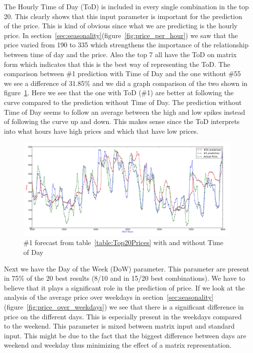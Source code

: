 The Hourly Time of Day (ToD) is included in every single combination in the top 20. This clearly shows that this input parameter is important for the prediction of the price. This is kind of obvious since what we are predicting is the hourly price. In section~\ref{sec:seasonality}(figure~\ref{fig:price_per_hour}) we saw that the price varied from 190 to 335 which strengthens the importance of the relationship between time of day and the price. Also the top 7 all have the ToD on matrix form which indicates that this is the best way of representing the ToD. The comparison between \#1 prediction with Time of Day and the one without \#55 we see a difference of 31.85\% and we did a graph comparison of the two shown in figure~\ref{fig:dowComparison}. Here we see that the one with ToD (\#1) are better at following the curve compared to the prediction without Time of Day. The prediction without Time of Day seems to follow an average between the high and low spikes instead of following the curve up and down. This makes sense since the ToD interprets into what hours have high prices and which that have low prices.

\begin{figure}[H]
\centering
\includegraphics[width=\linewidth,natwidth=898,natheight=587]{billeder/PriceExperimentalAnalysis/dowComparison.png}
\caption{\#1 forecast from table~\ref{table:Top20Prices} with and without Time of Day}
\label{fig:dowComparison}
\end{figure}

Next we have the Day of the Week (DoW) parameter. This parameter are present in 75\% of the 20 best results (8/10 and in 15/20 best combinations). We have to believe that it plays a significant role in the prediction of price. If we look at the analysis of the average price over weekdays in section~\ref{sec:seasonality}(figure~\ref{fig:price_over_weekdays}) we see that there is a significant difference in price on the different days. This is especially present in the weekdays compared to the weekend. This parameter is mixed between matrix input and standard input. This might be due to the fact that the biggest difference between days are weekend and weekday thus minimizing the effect of a matrix representation. 

